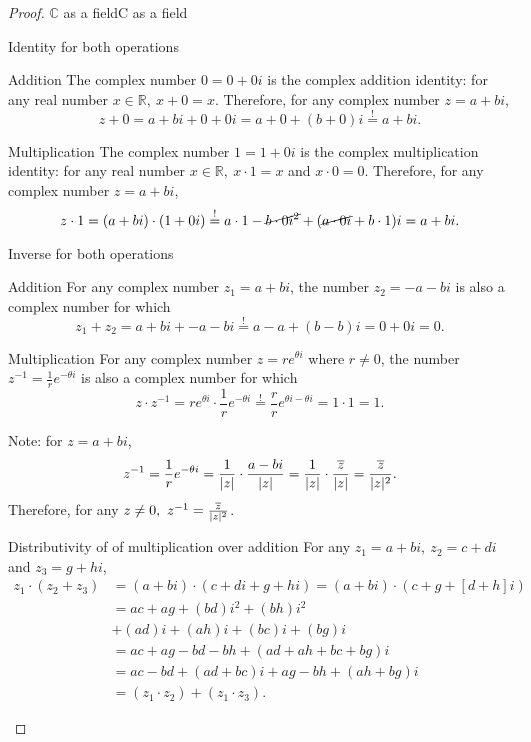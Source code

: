 \begin{proof}{$\bm{\mathbb{C}}$ as a field}{C as a field}
\begin{descitemize}
		\item[Identity for both operations]~\\
			\begin{listitemize}
			\item[Addition] The complex number $0=0+0i$ is the complex addition identity: for any real number $x\in\mathbb{R},\ x+0=x$. Therefore, for any complex number $z=a+bi$,
				\[
					z+0 = a+bi + 0+0i = a+0 + (b+0)i \overset{!}{=} a+bi.
				\]
			\item[Multiplication] The complex number $1=1+0i$ is the complex multiplication identity: for any real number $x\in\mathbb{R},\ x\cdot1=x$ and $x\cdot0=0$. Therefore, for any complex number $z=a+bi$,
				\[
					z\cdot1 = (a+bi)\cdot(1+0i) \overset{!}{=}a\cdot1-\cancel{b\cdot0i^{2}} + (\cancel{a\cdot0i}+b\cdot1)i = a+bi.
				\]

			\end{listitemize}
		
		\item[Inverse for both operations]~\\
			\begin{listitemize}
			\item[Addition] For any complex number $z_{1}=a+bi$, the number $z_{2}=-a-bi$ is also a complex number for which
				\[
					z_{1} + z_{2} = a+bi + -a-bi \overset{!}{=} a-a + (b-b)i = 0 + 0i = 0.
				\]
			\item[Multiplication] For any complex number $z=re^{\theta i}$ where $r\neq0$, the number $z^{-1}=\frac{1}{r}e^{-\theta i}$ is also a complex number for which
				\[
					z \cdot z^{-1} = re^{\theta i} \cdot \frac{1}{r}e^{-\theta i} \overset{!}{=} \frac{r}{r}e^{\theta i - \theta i} = 1\cdot1 = 1.
				\]
				
			Note: for $z=a+bi$,
			\[
				z^{-1} = \frac{1}{r}e^{-\theta i} = \frac{1}{|z|}\cdot\frac{a-bi}{|z|} = \frac{1}{|z|}\cdot\frac{\overline{z}}{|z|} = \frac{\overline{z}}{|z|^{2}}.
			\]
			Therefore, for any $z\neq0,\ z^{-1} = \frac{\overline{z}}{|z|^{2}}$.
			\end{listitemize}

		\item[Distributivity of of multiplication over addition] For any $z_{1}=a+bi,\ z_{2}=c+di$ and $z_{3}=g+hi$,
			\begin{align*}
				z_{1}\cdot(z_{2}+z_{3}) &= (a+bi)\cdot(c+di + g+hi) = (a+bi)\cdot(c+g + [d+h]i)\\
				&= ac + ag + (bd)i^{2} + (bh)i^{2}\\
				&+ (ad)i + (ah)i + (bc)i + (bg)i\\
				&= ac + ag - bd - bh + (ad + ah + bc + bg)i\\
				&= ac-bd + (ad+bc)i + ag-bh + (ah+bg)i\\
				&= (z_{1}\cdot z_{2}) + (z_{1}\cdot z_{3}).
			\end{align*}
	\end{descitemize}
\end{proof}
